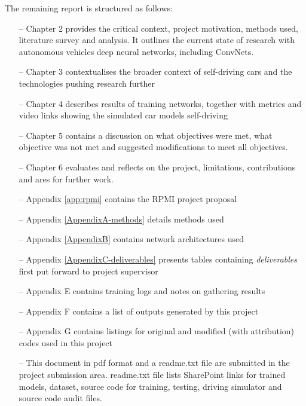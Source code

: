 The remaining report is structured as follows:
\begin{itemize}
    \item[--] Chapter 2 provides the critical context, project motivation, methods used, literature survey and analysis. It outlines the current state of research with autonomous vehicles deep neural networks, including ConvNets.
    \item[--] Chapter 3 contextualises the broader context of self-driving cars and the technologies pushing research further
    \item[--] Chapter 4 describes results of training networks, together with metrics and video links showing the simulated car models self-driving
    \item[--] Chapter 5 contains a discussion on what objectives were met, what objective was not met and suggested modifications to meet all objectives.
    \item[--] Chapter 6 evaluates and reflects on the project, limitations, contributions and ares for further work.
    \item[--] Appendix \ref{app:rpmi} contains the RPMI project proposal
    \item[--] Appendix \ref{AppendixA-methods} details methods used 
    \item[--] Appendix \ref{AppendixB} contains network architectures used
    \item[--] Appendix \ref{AppendixC-deliverables}  presents tables containing \textit{deliverables} first put forward to project supervisor 
    \item[--] Appendix E contains training logs and notes on gathering results
    \item[--] Appendix F contains a list of outputs generated by this project
    \item[--] Appendix G contains listings for original and modified (with attribution) codes used in this project
    \item[--] This document in pdf format and a readme.txt file are submitted in the project submission area. readme.txt file lists SharePoint links for trained models, dataset, source code for training, testing, driving simulator and source code audit files.
\end{itemize}
